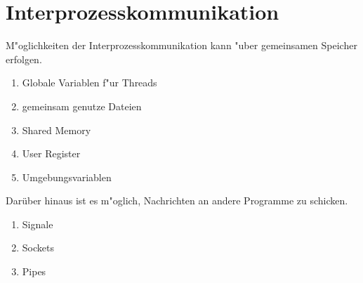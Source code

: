\section{Interprozesskommunikation}

M"oglichkeiten der Interprozesskommunikation kann "uber gemeinsamen Speicher erfolgen. 
\begin{enumerate}
	\item Globale Variablen f"ur Threads
	\item gemeinsam genutze Dateien
	\item Shared Memory
	\item User Register
	\item Umgebungsvariablen
\end{enumerate} 
Darüber hinaus ist es m"oglich, Nachrichten an andere Programme zu schicken.
\begin{enumerate}
	\item Signale
	\item Sockets
	\item Pipes
\end{enumerate}

